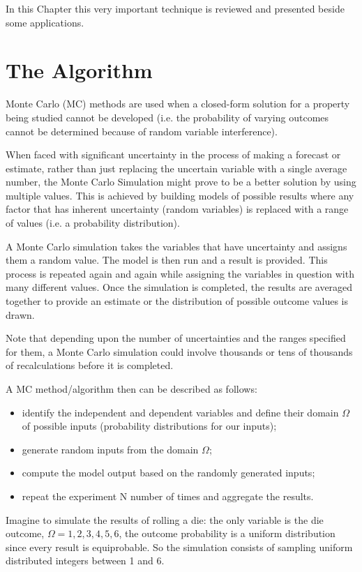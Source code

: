 In this Chapter this very important technique is reviewed and presented beside some applications.

\section{The Algorithm}
\label{whats-monte-carlo-simulation}

Monte Carlo (MC) methods are used when a closed-form solution for a property being studied cannot be developed (i.e. the probability of varying outcomes cannot be determined because of random variable interference).

When faced with significant uncertainty in the process of making a forecast or estimate, rather than just replacing the uncertain variable with a single average number, the Monte Carlo Simulation might prove to be a better solution by using multiple values.
This is achieved by building models of possible results where any factor that has inherent uncertainty (random variables) is replaced with a range of values (i.e. a probability distribution).

A Monte Carlo simulation takes the variables that have uncertainty and assigns them a random value. The model is then run and a result is provided. This process is repeated again and again while assigning the variables in question with many different values. Once the simulation is completed, the results are averaged together to provide an estimate or the distribution of possible outcome values is drawn.

Note that depending upon the number of uncertainties and the ranges specified for them, a Monte Carlo simulation could involve thousands or tens of thousands of recalculations before it is completed.

A MC method/algorithm then can be described as follows:

\begin{itemize}
\item  identify the independent and dependent variables and define their domain $\Omega$ of possible inputs (probability distributions for our inputs);
\item generate random inputs from the domain \(\Omega\);
\item compute the model output based on the randomly generated inputs;
\item repeat the experiment N number of times and aggregate the results.
\end{itemize}

Imagine to simulate the results of rolling a die: the only variable is the die outcome,  $\Omega =1,2,3,4,5,6$, the outcome probability is a uniform distribution since every result is equiprobable. So the simulation consists of sampling uniform distributed integers between 1 and 6.

